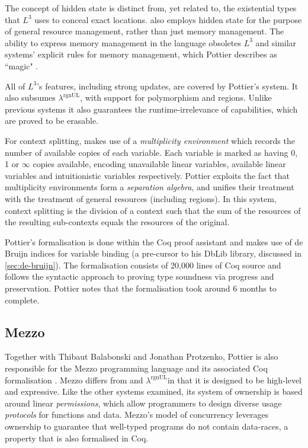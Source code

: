 \documentclass[]{unswthesis}
\newcommand{\rgnUL}{$\lambda^\text{rgnUL}$\text{ }}
\newcommand{\SSPHS}{\text{SSPHS }}
\let\i\textit
\begin{document}
The concept of hidden state is distinct from, yet related to, the existential types that $L^3$ uses to conceal exact locations. \SSPHS also employs hidden state for the purpose of general resource management, rather than just memory management. The ability to express memory management in the language obsoletes $L^3$ and similar systems' explicit rules for memory management, which Pottier describes as ``magic" \cite{pottier13}.

All of $L^3$'s features, including strong updates, are covered by Pottier's system. It also subsumes \rgnUL, with support for polymorphism and regions. Unlike previous systems it also guarantees the runtime-irrelevance of capabilities, which are proved to be erasable.

For context splitting, \SSPHS makes use of a \i{multiplicity environment} which records the number of available copies of each variable. Each variable is marked as having 0, 1 or $\infty$ copies available, encoding unavailable linear variables, available linear variables and intuitionistic variables respectively. Pottier exploits the fact that multiplicity environments form a \i{separation algebra}, and unifies their treatment with the treatment of general resources (including regions). In this system, context splitting is the division of a context such that the sum of the resources of the resulting sub-contexts equals the resources of the original.

Pottier's formalisation is done within the Coq proof assistant and makes use of de Bruijn indices for variable binding (a pre-cursor to his DbLib library, discussed in \cref{sec:de-bruijn}). The formalisation consists of 20,000 lines of Coq source and follows the syntactic approach to proving type soundness via progress and preservation. Pottier notes that the formalisation took around 6 months to complete.

\subsection{Mezzo}

Together with Thibaut Balabonski and Jonathan Protzenko, Pottier is also responsible for the Mezzo programming language and its associated Coq formalisation \cite{mezzo14}. Mezzo differs from \SSPHS and \rgnUL in that it is designed to be high-level and expressive. Like the other systems examined, its system of ownership is based around linear \i{permissions}, which allow programmers to design diverse usage \i{protocols} for functions and data. Mezzo's model of concurrency leverages ownership to guarantee that well-typed programs do not contain data-races, a property that is also formalised in Coq.
\end{document}
